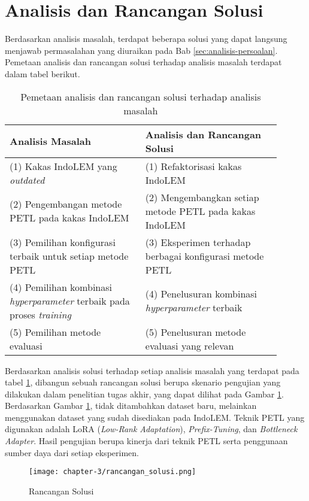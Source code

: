 \section{Analisis dan Rancangan Solusi}

Berdasarkan analisis masalah, terdapat beberapa solusi yang dapat langsung menjawab permasalahan yang diuraikan pada Bab \ref{sec:analisis-persoalan}. Pemetaan analisis dan rancangan solusi terhadap analisis masalah terdapat dalam tabel berikut.

\begin{table}[h!]
    \centering
    \begin{tabular}{|m{0.45\linewidth}|m{0.45\linewidth}|}
    \hline
    \rowcolor{black!10}
    \textbf{Analisis Masalah} & \textbf{Analisis dan Rancangan Solusi} \\ \hline
    (1) Kakas IndoLEM yang \textit{outdated} & (1) Refaktorisasi kakas IndoLEM \\ \hline
    (2) Pengembangan metode PETL pada kakas IndoLEM & (2) Mengembangkan setiap metode PETL pada kakas IndoLEM \\ \hline
    (3) Pemilihan konfigurasi terbaik untuk setiap metode PETL & (3) Eksperimen terhadap berbagai konfigurasi metode PETL \\ \hline
    (4) Pemilihan kombinasi \textit{hyperparameter} terbaik pada proses \textit{training} & (4) Penelusuran kombinasi \textit{hyperparameter} terbaik\\ \hline
    (5) Pemilihan metode evaluasi & (5) Penelusuran metode evaluasi yang relevan \\ \hline
    \end{tabular}
\caption{Pemetaan analisis dan rancangan solusi terhadap analisis masalah}
\label{table:pemetaan-masalah-solusi}
\end{table}

Berdasarkan analisis solusi terhadap setiap analisis masalah yang terdapat pada tabel \ref{table:pemetaan-masalah-solusi}, dibangun sebuah rancangan solusi berupa skenario pengujian yang dilakukan dalam penelitian tugas akhir, yang dapat dilihat pada Gambar \ref{fig:rancangan-solusi}. Berdasarkan Gambar \ref{fig:rancangan-solusi}, tidak ditambahkan dataset baru, melainkan menggunakan dataset yang sudah disediakan pada IndoLEM. Teknik PETL yang digunakan adalah LoRA (\textit{Low-Rank Adaptation}), \textit{Prefix-Tuning}, dan \textit{Bottleneck Adapter}. Hasil pengujian berupa kinerja dari teknik PETL serta penggunaan sumber daya dari setiap eksperimen.

\begin{figure}[ht]
    \centering
    \texttt{[image: chapter-3/rancangan\_solusi.png]}
    \caption{Rancangan Solusi}
    \label{fig:rancangan-solusi}
\end{figure}
